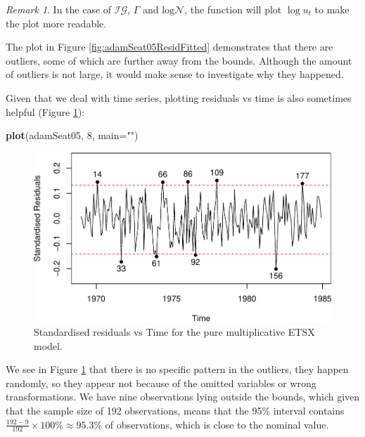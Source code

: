 \documentclass[]{book}
\newenvironment{Shaded}{\begin{snugshade}}{\end{snugshade}}
\newcommand{\DataTypeTok}[1]{\textcolor[rgb]{0.13,0.29,0.53}{#1}}
\newcommand{\DecValTok}[1]{\textcolor[rgb]{0.00,0.00,0.81}{#1}}
\newcommand{\KeywordTok}[1]{\textcolor[rgb]{0.13,0.29,0.53}{\textbf{#1}}}
\newcommand{\NormalTok}[1]{#1}
\newcommand{\StringTok}[1]{\textcolor[rgb]{0.31,0.60,0.02}{#1}}
\theoremstyle{definition}
\theoremstyle{definition}
\theoremstyle{definition}
\theoremstyle{definition}
\theoremstyle{remark}
\newtheorem*{remark}{Remark}
\begin{document}
\begin{remark}
In the case of \(\mathcal{IG}\), \(\Gamma\) and \(\mathrm{log}\mathcal{N}\), the function will plot \(\log u_t\) to make the plot more readable.
\end{remark}

The plot in Figure \ref{fig:adamSeat05ResidFitted} demonstrates that there are outliers, some of which are further away from the bounds. Although the amount of outliers is not large, it would make sense to investigate why they happened.

Given that we deal with time series, plotting residuals vs time is also sometimes helpful (Figure \ref{fig:adamSeat05ResidTime}):

\begin{Shaded}
\begin{Highlighting}[]
\KeywordTok{plot}\NormalTok{(adamSeat05, }\DecValTok{8}\NormalTok{, }\DataTypeTok{main=}\StringTok{""}\NormalTok{)}
\end{Highlighting}
\end{Shaded}

\begin{figure}
\centering
\includegraphics{Svetunkov--2022----ADAM_files/figure-latex/adamSeat05ResidTime-1.pdf}
\caption{\label{fig:adamSeat05ResidTime}Standardised residuals vs Time for the pure multiplicative ETSX model.}
\end{figure}

We see in Figure \ref{fig:adamSeat05ResidTime} that there is no specific pattern in the outliers, they happen randomly, so they appear not because of the omitted variables or wrong transformations. We have nine observations lying outside the bounds, which given that the sample size of 192 observations, means that the 95\% interval contains \(\frac{192-9}{192} \times 100 \% \approx 95.3 \%\) of observations, which is close to the nominal value.
\end{document}
